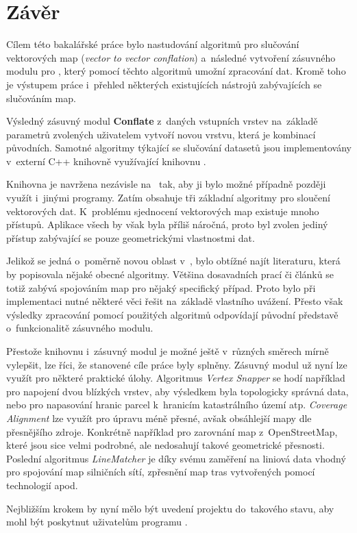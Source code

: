 \chapter{Závěr}
\label{9-zaver}

Cílem této bakalářské práce bylo nastudování algoritmů pro
slučování vektorových map (\textit{vector to vector conflation})
a~následné vytvoření zásuvného modulu pro , 
který pomocí těchto algoritmů umožní zpracování dat. Kromě 
toho je výstupem práce i~přehled některých existujících 
nástrojů zabývajících se slučováním map.

Výsledný zásuvný modul \textbf{Conflate} z~daných vstupních 
vrstev na~základě para\-metrů zvolených uživatelem vytvoří novou 
vrstvu, která je kombinací původních. Samotné algoritmy týkající 
se slučování datasetů jsou implementovány v~externí C++ knihovně
 využívající knihovnu . 

Knihovna  je navržena nezávisle na~  tak, 
aby ji bylo možné případně později využít i~jinými programy. Zatím
obsahuje tři základní algoritmy pro sloučení vektorových dat. 
K~problému sjednocení vektorových map existuje mnoho přístupů. 
Aplikace všech by však byla příliš náročná, proto byl zvolen jediný 
přístup zabývající se pouze geometrickými vlastnostmi dat.

Jelikož se jedná o~poměrně novou oblast v~, bylo
obtížné najít literaturu, která by popisovala nějaké obecné 
algoritmy. Většina dosavadních prací či článků se totiž zabývá 
spojováním map pro nějaký specifický případ. Proto bylo při 
implementaci nutné některé věci řešit na~základě vlastního uvážení. 
Přesto však výsledky zpracování pomocí použitých algoritmů
odpovídají původní představě o~funkcionalitě zásuvného modulu.

Přestože knihovnu i~zásuvný modul je možné ještě v~různých směrech 
mírně vylepšit, lze říci, že stanovené cíle práce byly splněny. 
Zásuvný modul už nyní lze využít pro některé praktické úlohy.
Algoritmus \textit{Vertex Snapper} se hodí například pro napojení
dvou blízkých vrstev, aby výsledkem byla topologicky správná data,
nebo pro napasování hranic parcel k~hranicím katastrálního území atp.
\textit{Coverage Alignment} lze využít pro úpravu méně přesné, avšak
obsáhlejší mapy dle přesnějšího zdroje. Konkrétně například pro 
zarovnání map z~OpenStreetMap, které jsou sice velmi podrobné, ale
nedosahují takové geometrické přesnosti. Poslední algoritmus
\textit{LineMatcher} je díky svému zaměření na liniová data vhodný
pro spojování map silničních sítí, zpřesnění map tras vytvořených 
pomocí  technologií apod. 

Nejbližším krokem by nyní mělo být uvedení projektu do~takového 
stavu, aby mohl být poskytnut uživatelům programu .